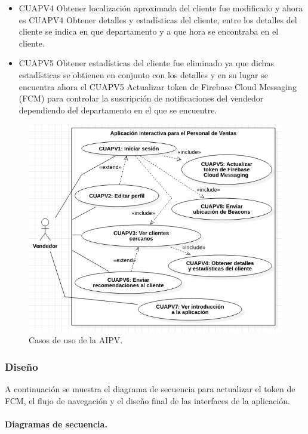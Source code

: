 \begin{itemize}
\item CUAPV4 Obtener localización aproximada del cliente fue modificado y ahora es CUAPV4 Obtener detalles y estadísticas del cliente, entre los detalles del cliente se indica en que departamento y a que hora se encontraba en el cliente.
\item CUAPV5 Obtener estadísticas del cliente fue eliminado ya que dichas estadísticas se obtienen en conjunto con los detalles y en su lugar se encuentra ahora el CUAPV5 Actualizar token de Firebase Cloud Messaging (FCM) para controlar la suscripción de notificaciones del vendedor dependiendo del departamento en el que se encuentre.
\end{itemize}

\FloatBarrier
\begin{figure}[htbp!]
		\centering
			\includegraphics[width=.8 \textwidth]{imagenes/adrian/vendedor/prototipoFinal/casosDeUso}
		\caption{Casos de uso de la AIPV.}
		\label{casos-uso-AIPVFinal}
\end{figure}
\FloatBarrier

\subsubsection{Diseño}

A continuación se muestra el diagrama de secuencia para actualizar el token de FCM, el flujo de navegación y el diseño final de las interfaces de la aplicación.\\ \par

\paragraph{Diagramas de secuencia.} ~\\

